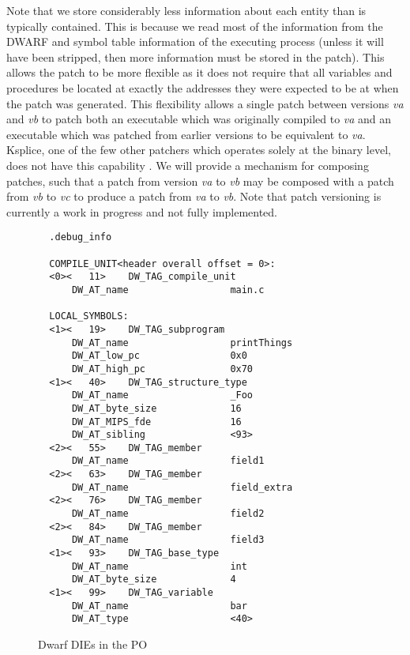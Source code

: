 Note that we store considerably less information about each entity
than is typically contained. This is because we read most of the
information from the DWARF and symbol table information of the
executing process (unless it will have been stripped, then more
information must be stored in the patch). This allows the patch to be
more flexible as it does not require that all variables and procedures
be located at exactly the addresses they were expected to be at when
the patch was generated. This flexibility allows a single patch
between versions \emph{va} and \emph{vb} to patch both an executable
which was originally compiled to \emph{va} and an executable which was
patched from earlier versions to be equivalent to \emph{va}. Ksplice,
one of the few other patchers which operates solely at the binary
level, does not have this capability \cite{ksplice}. We will provide a
mechanism for composing patches, such that a patch from version
\emph{va} to \emph{vb} may be composed with a patch from \emph{vb} to
\emph{vc} to produce a patch from \emph{va} to \emph{vb}. Note that
patch versioning is currently a work in progress and not fully
implemented.
\begin{figure}[ht]
{\small
\begin{center}
\begin{verbatim}
  .debug_info

  COMPILE_UNIT<header overall offset = 0>:
  <0><   11>	DW_TAG_compile_unit
      DW_AT_name                  main.c

  LOCAL_SYMBOLS:
  <1><   19>	DW_TAG_subprogram
      DW_AT_name                  printThings
      DW_AT_low_pc                0x0
      DW_AT_high_pc               0x70
  <1><   40>	DW_TAG_structure_type
      DW_AT_name                  _Foo
      DW_AT_byte_size             16
      DW_AT_MIPS_fde              16
      DW_AT_sibling               <93>
  <2><   55>	DW_TAG_member
      DW_AT_name                  field1
  <2><   63>	DW_TAG_member
      DW_AT_name                  field_extra
  <2><   76>	DW_TAG_member
      DW_AT_name                  field2
  <2><   84>	DW_TAG_member
      DW_AT_name                  field3
  <1><   93>	DW_TAG_base_type
      DW_AT_name                  int
      DW_AT_byte_size             4
  <1><   99>	DW_TAG_variable
      DW_AT_name                  bar
      DW_AT_type                  <40>
\end{verbatim}
\end{center}
}
\caption{Dwarf DIEs in the PO}
\label{fig:dies}
\vspace{-10pt}
\end{figure}

